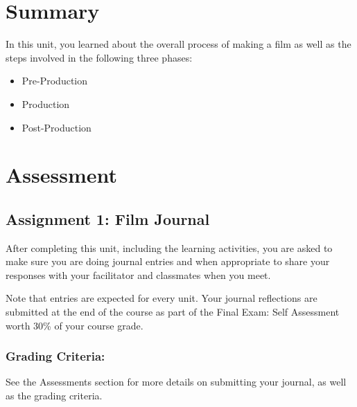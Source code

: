 \documentclass[
]{book}
\providecommand{\tightlist}{%
  \setlength{\itemsep}{0pt}\setlength{\parskip}{0pt}}
\begin{document}
\hypertarget{summary-1}{%
\section*{Summary}\label{summary-1}}

In this unit, you learned about the overall process of making a film as well as the steps involved in the following three phases:

\begin{itemize}
\tightlist
\item
  Pre-Production\\
\item
  Production\\
\item
  Post-Production
\end{itemize}

\hypertarget{assessment-2}{%
\section*{Assessment}\label{assessment-2}}

\begin{assessment}
\hypertarget{assignment-1-film-journal}{%
\subsection*{Assignment 1: Film Journal}\label{assignment-1-film-journal}}

After completing this unit, including the learning activities, you are asked to make sure you are doing journal entries and when appropriate to share your responses with your facilitator and classmates when you meet.

Note that entries are expected for every unit. Your journal reflections are submitted at the end of the course as part of the Final Exam: Self Assessment worth 30\% of your course grade.

\hypertarget{grading-criteria-1}{%
\subsubsection*{Grading Criteria:}\label{grading-criteria-1}}

See the Assessments section for more details on submitting your journal, as well as the grading criteria.
\end{assessment}
\end{document}
